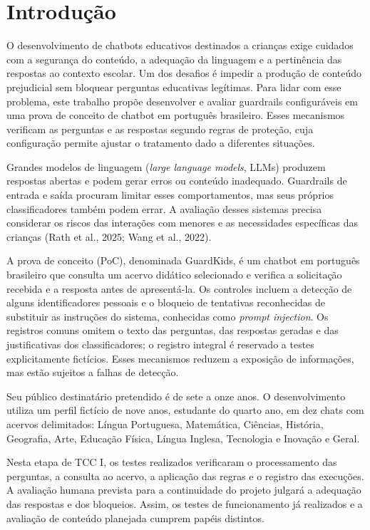 \chapter{Introdução}\label{cap:intro}

O desenvolvimento de chatbots educativos destinados a crianças exige cuidados com a segurança do conteúdo, a adequação da linguagem e a pertinência das respostas ao contexto escolar. Um dos desafios é impedir a produção de conteúdo prejudicial sem bloquear perguntas educativas legítimas. Para lidar com esse problema, este trabalho propõe desenvolver e avaliar guardrails configuráveis em uma prova de conceito de chatbot em português brasileiro. Esses mecanismos verificam as perguntas e as respostas segundo regras de proteção, cuja configuração permite ajustar o tratamento dado a diferentes situações.

Grandes modelos de linguagem (\textit{large language models}, LLMs) produzem respostas abertas e podem gerar erros ou conteúdo inadequado. Guardrails de entrada e saída procuram limitar esses comportamentos, mas seus próprios classificadores também podem errar. A avaliação desses sistemas precisa considerar os riscos das interações com menores e as necessidades específicas das crianças (Rath et al., 2025; Wang et al., 2022).

A prova de conceito (PoC), denominada GuardKids, é um chatbot em português brasileiro que consulta um acervo didático selecionado e verifica a solicitação recebida e a resposta antes de apresentá-la. Os controles incluem a detecção de alguns identificadores pessoais e o bloqueio de tentativas reconhecidas de substituir as instruções do sistema, conhecidas como \textit{prompt injection}. Os registros comuns omitem o texto das perguntas, das respostas geradas e das justificativas dos classificadores; o registro integral é reservado a testes explicitamente fictícios. Esses mecanismos reduzem a exposição de informações, mas estão sujeitos a falhas de detecção.

Seu público destinatário pretendido é de sete a onze anos. O desenvolvimento utiliza um perfil fictício de nove anos, estudante do quarto ano, em dez chats com acervos delimitados: Língua Portuguesa, Matemática, Ciências, História, Geografia, Arte, Educação Física, Língua Inglesa, Tecnologia e Inovação e Geral.

Nesta etapa de TCC I, os testes realizados verificaram o processamento das perguntas, a consulta ao acervo, a aplicação das regras e o registro das execuções. A avaliação humana prevista para a continuidade do projeto julgará a adequação das respostas e dos bloqueios. Assim, os testes de funcionamento já realizados e a avaliação de conteúdo planejada cumprem papéis distintos.

